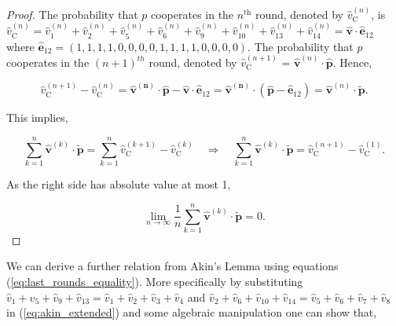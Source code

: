 \documentclass{article}
\theoremstyle{definition}
\begin{document}
\begin{proof}
  The probability that \(p\) cooperates in the \(n^{\text{th}}\) round, denoted
  by \(\hat{v}_{\text{C}}^{(n)}\), is \(\hat{v}_{\text{C}}^{(n)} = \hat{v}_{1}^{(n)} +
  \hat{v}_{2}^{(n)} + \hat{v}_{5}^{(n)} + \hat{v}_{6}^{(n)} + \hat{v}_{9}^{(n)} +  \hat{v}_{10}^{(n)} +
  \hat{v}_{13}^{(n)} + \hat{v}_{14}^{(n)} = \mathbf{\hat{v}} \cdot \mathbf{\hat{e}}_{1 2}\)
  where \(\mathbf{\hat{e}}_{1 2} = (1, 1, 1, 1, \allowbreak 0,
  0, 0, 0, 1, 1, 1, 1, 0, 0, 0, 0)\). The probability that \(p\) cooperates in the \((n + 1)^{th}\) round, denoted
  by \(\hat{v}_{\text{C}}^{(n + 1)}\) = \(\mathbf{\hat{v}}^{(n)} \cdot \mathbf{\hat{p}}\).
  Hence,

  \begin{equation*}
   \hat{v}_{\text{C}}^{(n + 1)} \!- \!\hat{v}_{\text{C}}^{(n)} = \mathbf{\hat{v}^{(n)}} \cdot \mathbf{\hat{p}} \!- \!\mathbf{\hat{v}} \cdot \mathbf{\hat{e}}_{1 2}
    = \mathbf{\hat{v}^{(n)}} \cdot (\mathbf{\hat{p}} \!- \!\mathbf{\hat{e}}_{1 2}) = \mathbf{\hat{v}}^{(n)} \cdot \mathbf{\tilde{p}}.
  \end{equation*}

  This implies,

  \begin{equation}
    \sum^{n}_{k=1} \mathbf{\hat{v}}^{(k)} \cdot \mathbf{\tilde{p}} = \sum^{n}_{k=1} \hat{v}_{\text{C}}^{(k + 1)} \!- \!\hat{v}_{\text{C}}^{(k)} \quad \Rightarrow \quad \sum^{n}_{k=1} \mathbf{\hat{v}}^{(k)} \cdot \mathbf{\tilde{p}} =  \hat{v}_{\text{C}}^{(n + 1)} \!- \!\hat{v}_{\text{C}}^{(1)}.
   \end{equation}

   As the right side has absolute value at most 1,

   \begin{equation}
    \lim_{n \rightarrow \infty} \frac{1}{n} \sum^{n}_{k=1} \mathbf{\hat{v}}^{(k)} \cdot \mathbf{\tilde{p}} = 0. 
   \end{equation}

\end{proof}

We can derive a further relation from Akin's Lemma using equations
(\ref{eq:last_rounds_equality}). More specifically by substituting \(\hat{v}_{1} +
\hat{v}_{5} + \hat{v}_{9} + \hat{v}_{13} = \hat{v}_{1} +
\hat{v}_{2} + \hat{v}_{3} + \hat{v}_{4} \) and \(\hat{v}_{2} + \hat{v}_{6} + \hat{v}_{10} + \hat{v}_{14} =
\hat{v}_{5} + \hat{v}_{6} + \hat{v}_{7} + \hat{v}_{8} \) in (\ref{eq:akin_extended}) and some
algebraic manipulation one can show that,
\end{document}
